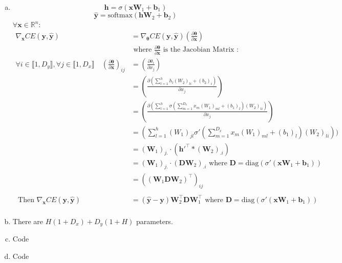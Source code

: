\documentclass[19pt]{extarticle}
\begin{document}
\begin{enumerate}[a)]
\item $$\bm{h} = \sigma(\bm{xW}_1 + \bm{b}_1) $$
$$\hat{\bm{y}} = \text{softmax}(\bm{hW}_2 + \bm{b}_2) $$
$\forall \bm{x} \in \mathds{R}^n :$
\begin{equation*}\begin{split}
 \nabla_{\bm{x}} CE(\bm{y},\hat{\bm{y}}) &=\nabla_{\bm{\theta}} CE(\bm{y},\hat{\bm{y}})   (\frac{\partial \bm{\theta}}{\partial \bm{x}})\\
 &\text{ where }\frac{\partial \bm{\theta}}{\partial \bm{x}}\text{ is the Jacobian Matrix : }\\
\forall i \in  \llbracket1,D_y \rrbracket, \forall j \in \llbracket1,D_x \rrbracket \quad (\frac{\partial \bm{\theta}}{\partial \bm{x}})_{ij} &= (\frac{\partial \theta_i}{\partial x_j})\\
 &= (\frac{\partial (\sum_{l = 1}^h h_l(W_2)_{li} + (b_2)_i)}{\partial x_j})\\
  &= (\frac{\partial (\sum_{l = 1}^h \sigma(\sum_{m=1}^{D_x}x_m(W_1)_{ml} +(b_1)_l)(W_2)_{li})}{\partial x_j})\\
    &= (\sum_{l = 1}^h(W_1)_{jl} \sigma'(\sum_{m=1}^{D_x}x_m(W_1)_{ml} +(b_1)_l)(W_2)_{li}))\\
    &= (\bm{W}_1)_{j.}\cdot (\bm{h}'^\top*(\bm{W}_2)_{.i})\\
    &= (\bm{W}_1)_{j.}\cdot (\bm{D}\bm{W}_2)_{.i}\text{ where } \bm{D} = \text{diag}(\sigma '(\bm{xW}_1 + \bm{b}_1))\\
    &= ((\bm{W}_1 \bm{D}\bm{W}_2)^{\top})_{ij}\\
    \\
    \text{ Then } \nabla_{\bm{x}} CE(\bm{y},\hat{\bm{y}}) &= (\hat{\bm{y}} - \bm{y})  \bm{W}_2^{\top} \bm{D}  \bm{W}_1^{\top} \text{ where } \bm{D} = \text{diag}(\sigma '(\bm{xW}_1 + \bm{b}_1))\\
   \end{split}\end{equation*}


\item There are $H(1 + D_x ) + D_y(1 + H)$ parameters. 

\item Code

\item Code


\end{enumerate}
\end{document}
